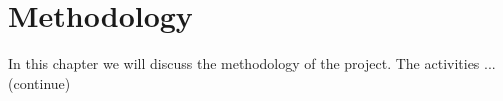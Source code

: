 \chapter{Methodology}

In this chapter we will discuss the methodology of the project. The activities ...(continue)

